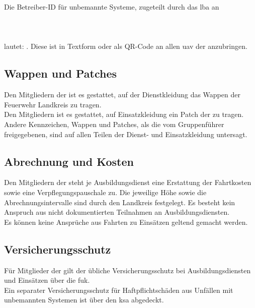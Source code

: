 Die Betreiber-ID für unbemannte Systeme, zugeteilt durch das \ac{lba} an\\

\indent\operatorName{}\\
\indent\operatorStreet{}\\
\indent\operatorZIP{} \operatorCity{}\\

\noindent lautet: \textbf{\operatorID{}}. Diese ist in Textform oder als QR-Code an allen \ac{uav} der \callee{} anzubringen.

\subsection{Wappen und Patches}

Den Mitgliedern der \callee{} ist es gestattet, auf der Dienstkleidung das Wappen der \flq Feuerwehr Landkreis \unit{}\frq{} zu tragen.\\

\noindent Den Mitgliedern ist es gestattet, auf Einsatzkleidung ein Patch der \callee{} zu tragen. Andere Kennzeichen, Wappen und Patches, als die vom Gruppenführer freigegebenen, sind auf allen Teilen der Dienst- und Einsatzkleidung untersagt.

\subsection{Abrechnung und Kosten}
\label{sec:accounting}

Den Mitgliedern der \callee{} steht je Ausbildungsdienst eine Erstattung der Fahrtkosten sowie eine Verpflegungspauschale zu. Die jeweilige Höhe sowie die Abrechnungsintervalle sind durch den Landkreis \district{} festgelegt. Es besteht kein Anspruch aus nicht dokumentierten Teilnahmen an Ausbildungsdiensten.\\

\noindent Es können keine Ansprüche aus Fahrten zu Einsätzen geltend gemacht werden.

\subsection{Versicherungsschutz}

Für Mitglieder der \callee{} gilt der übliche Versicherungsschutz bei Ausbildungsdiensten und Einsätzen über die \ac{fuk}.\\

\noindent Ein separater Versicherungsschutz für Haftpflichtschäden aus Unfällen mit unbemannten Systemen ist über den \ac{ksa} abgedeckt.\\

